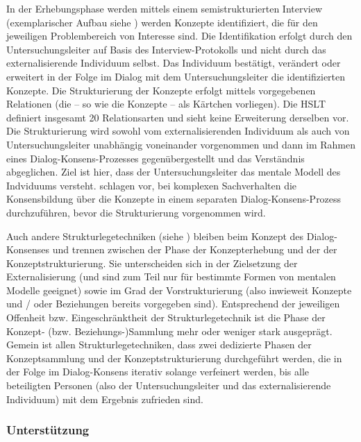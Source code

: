 In der Erhebungsphase werden mittels einem semistrukturierten Interview (exemplarischer Aufbau siehe \citep{Scheele88}) werden Konzepte identifiziert, die für den jeweiligen Problembereich von Interesse sind. Die Identifikation erfolgt durch den Untersuchungsleiter auf Basis des Interview-Protokolls und nicht durch das externalisierende Individuum selbst. Das Individuum bestätigt, verändert oder erweitert in der Folge im Dialog mit dem Untersuchungsleiter die identifizierten Konzepte. Die Strukturierung der Konzepte erfolgt mittels vorgegebenen Relationen (die -- so wie die Konzepte -- als Kärtchen vorliegen). Die \gls{HSLT} definiert insgesamt 20 Relationsarten und sieht keine Erweiterung derselben vor. Die Strukturierung wird sowohl vom externalisierenden Individuum als auch von Untersuchungsleiter unabhängig voneinander vorgenommen und dann im Rahmen eines Dialog-Konsens-Prozesses gegenübergestellt und das Verständnis abgeglichen. Ziel ist hier, dass der Untersuchungsleiter das mentale Modell des Indviduums versteht. \citet{Scheele88} schlagen vor, bei komplexen Sachverhalten die Konsensbildung über die Konzepte in einem separaten Dialog-Konsens-Prozess durchzuführen, bevor die Strukturierung vorgenommen wird.

Auch andere Strukturlegetechniken (siehe \citep{Dann92}) bleiben beim Konzept des Dialog-Konsenses und trennen zwischen der Phase der Konzepterhebung und der der Konzeptstrukturierung. Sie unterscheiden sich in der Zielsetzung der Externalisierung (und sind zum Teil nur für bestimmte Formen von mentalen Modelle geeignet) sowie im Grad der Vorstrukturierung (also inwieweit Konzepte und / oder Beziehungen bereits vorgegeben sind). Entsprechend der jeweiligen Offenheit bzw. Eingeschränktheit der Strukturlegetechnik ist die Phase der Konzept- (bzw. Beziehungs-)Sammlung mehr oder weniger stark ausgeprägt. Gemein ist allen Strukturlegetechniken, dass zwei dedizierte Phasen der Konzeptsammlung und der Konzeptstrukturierung durchgeführt werden, die in der Folge im Dialog-Konsens iterativ solange verfeinert werden, bis alle beteiligten Personen (also der Untersuchungsleiter und das externalisierende Individuum) mit dem Ergebnis zufrieden sind.

\subsubsection{Unterstützung}

